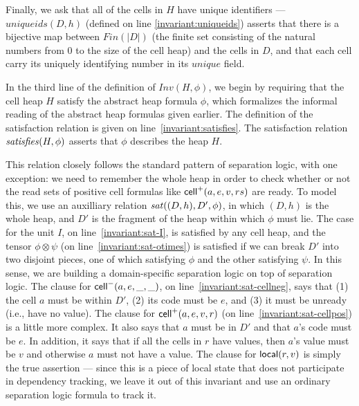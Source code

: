 \documentclass[preprint,natbib]{sigplanconf}
\begin{document}
Finally, we ask that all of the cells in $H$ have unique identifiers
--- $\mathit{uniqueids}(D,h)$ (defined on line \ref{invariant:uniqueids}) 
asserts that there is a bijective map
between $Fin(|D|)$ (the finite set consisting of the natural numbers
from 0 to the size of the cell heap) and the cells in $D$, and that 
each cell carry its uniquely identifying number in its $unique$ field.

In the third line of the definition of $Inv(H, \phi)$, we begin by
requiring that the cell heap $H$ satisfy the abstract heap formula
$\phi$, which formalizes the informal reading of the abstract heap
formulas given earlier. The definition of the satisfaction relation is
given on line~\ref{invariant:satisfies}. The satisfaction relation
$\mathit{satisfies}({H}, {\phi})$ asserts that $\phi$ describes the heap $H$. 

This relation closely follows the standard pattern of separation
logic, with one exception: we need to remember the whole heap in order
to check whether or not the read sets of positive cell formulas like
$\mbox{\textsf{{cell}}}^{+}({a}, {e}, {v}, {rs})$ are ready. To model this, we use an auxilliary
relation $\mathit{sat}((D,h), D', \phi)$, in which $(D,h)$ is the whole heap, and 
$D'$ is the fragment of the heap within which $\phi$ must lie. The case for
the unit $I$, on line~\ref{invariant:sat-I}, is satisfied by any cell
heap, and the tensor $\phi \otimes \psi$ (on line~\ref{invariant:sat-otimes}) 
is satisfied if we can break $D'$ into two disjoint pieces, one of which
satisfying $\phi$ and the other satisfying $\psi$. In this sense, we are
building a domain-specific separation logic on top of separation logic. 
The clause for $\mbox{\textsf{{cell}}}^{-}({a}, {e}, {\_}, {\_})$, on line~\ref{invariant:sat-cellneg}, says
that (1) the cell $a$ must be within $D'$, (2) its code must be $e$, and
(3) it must be unready (i.e., have no value). The clause for $\mbox{\textsf{{cell}}}^{+}({a}, {e}, {v}, {r})$
(on line~\ref{invariant:sat-cellpos}) is a little more complex. It also says that 
$a$ must be in $D'$ and that $a$'s code must be $e$. In addition, it says that 
if all the cells in $r$ have values, then $a$'s value must be $v$ and otherwise 
$a$ must not have a value. The clause for $\mbox{\textsf{{local}}}({r}, {v})$ is simply
the true assertion --- since this is a piece of local state that does not 
participate in dependency tracking, we leave it out of this 
invariant and use an ordinary separation logic formula to track it. 
\end{document}
